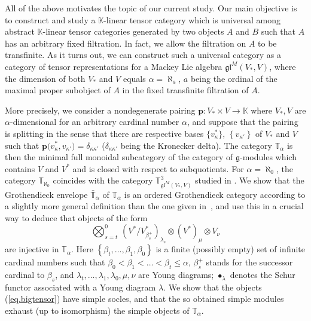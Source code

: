 \documentclass[11pt]{article}
\theoremstyle{plain}
\theoremstyle{nonumberplain}
\theoremstyle{plain}
\theoremstyle{nonumberplain}
\newcommand\bK{\mathbb K}
\newcommand\bT{\mathbb T}
\newcommand\fg{\mathfrak{g}}
\newcommand\fgl{\mathfrak{gl}}
\begin{document}
All of the above motivates the topic of our current study.  Our main
objective is to construct and study a
$\mathbb{K}$-linear tensor category which is universal among
abstract $\mathbb{K}$-linear tensor categories generated by two objects $A$ and $B$ such
that $A$ has an arbitrary fixed filtration.  In fact, we allow the
filtration on $A$ to be transfinite.  As it turns out, we can
construct such a universal category as a category of tensor
representations for a Mackey Lie algebra $\fgl^M(V_*,V)$, where the
dimension of both $V_*$ and $V$ equals $\alpha=\aleph_{a}$, $a$ being
the ordinal of the maximal proper subobject of $A$ in the fixed
transfinite filtration of $A$.

More precisely, we consider a nondegenerate pairing $\mathbf{p}:V_*\times V\to\bK$ where
$V_*,V$ are $\alpha$-dimensional for an arbitrary cardinal number $\alpha$, and suppose that the pairing is splitting in the sense that there are respective bases
$\big\{v^*_\kappa\big\}$, $\left\{v_{\kappa'}\right\}$ of $V_*$ and $V$ such that
$\mathbf{p}\big(v^*_\kappa,v_{\kappa'}\big)=\delta_{\kappa\kappa'}$
($\delta_{\kappa\kappa'}$ being the Kronecker delta).  The category $\bT_\alpha$ is then the minimal full monoidal subcategory of the
category of $\fg$-modules which contains $V$ and $V^*$ and is
closed with respect to subquotients.  For $\alpha=\aleph_0$, the
category $\bT_{\aleph_0}$ coincides with the category
$\bT^3_{\fgl^M(V_*,V)}$ studied in \cite{us}.   We show that the Grothendieck envelope $\bar{\bT}_{\alpha}$ of $\bT_\alpha$
is an ordered Grothendieck category according to a slightly more general definition than the one given in~\cite{us}, and use this in a crucial way
to deduce that objects of the form
\begin{equation}
	\bigotimes_{s=t}^0\,\left(V^*/V^*_{\beta^+_s}\right)_{\lambda_s}\otimes \left(V^*\right)_\mu\otimes V_\nu
	\label{eq.bigtensor}
\end{equation}
are injective in $\bT_\alpha$.  Here $\left\{\beta_t,\ldots,\beta_1,\beta_0\right\}$ is a finite (possibly empty) set of infinite cardinal
numbers such that $\beta_0<\beta_1<\ldots<\beta_t\leq \alpha$, $\beta_s^+$ stands for the successor cardinal
to $\beta_s$, and $\lambda_t,\ldots,\lambda_1,\lambda_0,\mu,\nu$ are
Young diagrams; $\bullet_\lambda$ denotes the Schur
functor associated with a Young diagram $\lambda$.  We show that the objects (\ref{eq.bigtensor}) have simple socles, and that the so obtained  simple modules exhaust (up to isomorphism) the simple objects of $\bT_\alpha$.  
\end{document}
